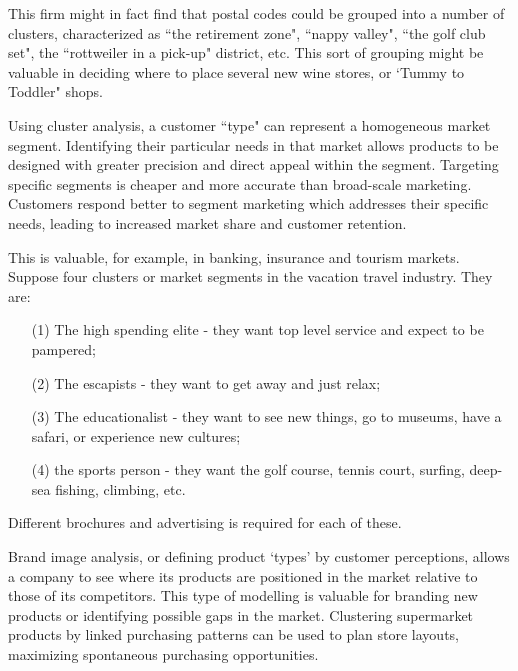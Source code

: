 \documentclass[a4paper,12pt]{report}
\begin{document}
This firm might in fact find that postal codes could be grouped into a number of clusters, characterized as ``the retirement zone", ``nappy valley", ``the golf club set", the ``rottweiler in a pick-up" district, etc. This sort of grouping might  be valuable in deciding where to place several new wine stores, or `Tummy to Toddler" shops.

Using cluster analysis, a customer ``type" can represent a homogeneous market segment.
Identifying their particular needs in that market allows products to be designed with greater
precision and direct appeal within the segment. Targeting specific segments is cheaper and
more accurate than broad-scale marketing. Customers respond better to segment marketing
which addresses their specific needs, leading to increased market share and customer
retention.

This is valuable, for example, in banking, insurance and tourism markets. Suppose
four clusters or market segments in the vacation travel industry. They are:
\begin{itemize}
	\item[(1)] The high spending elite - they want top level service and expect to be pampered;
	\item[(2)] The escapists - they want to get away and just relax;
	\item[(3)] The educationalist - they want to see new things, go to museums,
	have a safari, or experience new cultures;
	\item[(4)] the sports person - they want the golf course, tennis court, surfing, deep-sea fishing, climbing, etc.
\end{itemize}
Different brochures and advertising is required for each of these.

Brand image analysis, or defining product `types' by customer perceptions, allows
a company to see where its products are positioned in the market relative to those of its
competitors. This type of modelling is valuable for branding new products or identifying
possible gaps in the market. Clustering supermarket products by linked purchasing patterns
can be used to plan store layouts, maximizing spontaneous purchasing opportunities.
\end{document}
